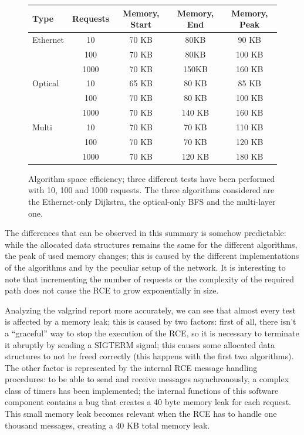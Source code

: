 \documentclass[10pt,a4paper]{report}
\begin{document}
\begin{figure}[!htbp]
  \begin{center}
    \begin{tabular}{|l|c|c|c|c|}
      \hline
      \textbf{Type} & \textbf{Requests} & \textbf{Memory, Start}
      & \textbf{Memory, End} & \textbf{Memory, Peak} \\ \hline
      Ethernet & 10 & 70 KB & 80KB & 90 KB \\
      & 100 & 70 KB & 80KB & 100 KB \\
      & 1000 & 70 KB & 150KB & 160 KB \\ \hline
      Optical & 10 & 65 KB & 80 KB & 85 KB \\
      & 100 & 70 KB & 80 KB & 100 KB \\
      & 1000 & 70 KB & 140 KB & 160 KB \\ \hline
      Multi & 10 & 70 KB & 70 KB & 110 KB \\
      & 100 & 70 KB & 70 KB & 120 KB \\
      & 1000 & 70 KB & 120 KB & 180 KB \\
      \hline
    \end{tabular}
    \caption[Algorithm space efficiency]{Algorithm space efficiency;
      three different tests have been performed with 10, 100 and 1000
      requests. The three algorithms considered are the Ethernet-only
      Dijkstra, the optical-only BFS and the multi-layer one.}
    \label{fig:test_eth}
  \end{center}
\end{figure}

The differences that can be observed in this summary is somehow
predictable: while the allocated data structures remains the same for
the different algorithms, the peak of used memory changes; this is
caused by the different implementations of the algorithms and by the
peculiar setup of the network. It is interesting to note that
incrementing the number of requests or the complexity of the required
path does not cause the RCE to grow exponentially in size.

Analyzing the valgrind report more accurately, we can see that almost
every test is affected by a memory leak; this is caused by two
factors: first of all, there isn't a ``graceful'' way to stop the
execution of the RCE, so it is necessary to terminate it abruptly by
sending a SIGTERM signal; this causes some allocated data structures
to not be freed correctly (this happens with the first two
algorithms). The other factor is represented by the internal RCE
message handling procedures: to be able to send and receive messages
asynchronously, a complex class of timers has been implemented; the
internal functions of this software component contains a bug that
creates a 40 byte memory leak for each request. This small memory leak
becomes relevant when the RCE has to handle one thousand messages,
creating a 40 KB total memory leak.
\end{document}
